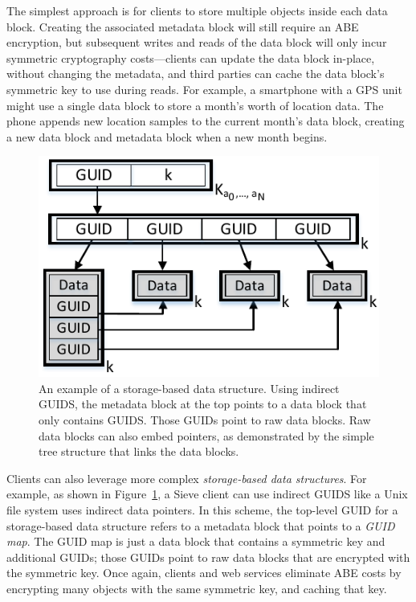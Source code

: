 The simplest approach is for clients to
store multiple objects inside each data block.
Creating the associated metadata block
will still require an ABE encryption,
but subsequent writes and reads of the data
block will only incur symmetric cryptography
costs---clients can update the data block
in-place, without changing the metadata,
and third parties can cache the data block's
symmetric key to use during reads. For
example, a smartphone with a GPS unit might
use a single data block to store a month's
worth of location data. The phone appends
new location samples to the current month's
data block, creating a new data block and
metadata block when a new month begins.

\begin{figure}
  \centering
     \includegraphics{figs/guidMap2.pdf}
     \caption[Example of Sieve storage-based data structure]
     {An example of a storage-based data structure. 
              Using indirect GUIDS, the metadata block at the top
              points to a data block that only contains GUIDS.
              Those GUIDs point to raw data blocks. Raw data blocks
              can also embed pointers, as demonstrated by the simple
              tree structure that links the data blocks.}
  \label{fig:guidMap}
\end{figure}

Clients can also leverage more complex \emph{storage-based
data structures}. For example, as shown in
Figure~\ref{fig:guidMap}, a Sieve client can
use indirect GUIDS like a Unix file system uses
indirect data pointers. In this scheme, the
top-level GUID for a storage-based data
structure refers to a metadata block that
points to a \emph{GUID map}. The GUID map
is just a data block that contains a symmetric
key and additional GUIDs; those GUIDs point to
raw data blocks that are encrypted with the
symmetric key. Once again, clients and web
services eliminate ABE costs by encrypting
many objects with the same symmetric key,
and caching that key.

